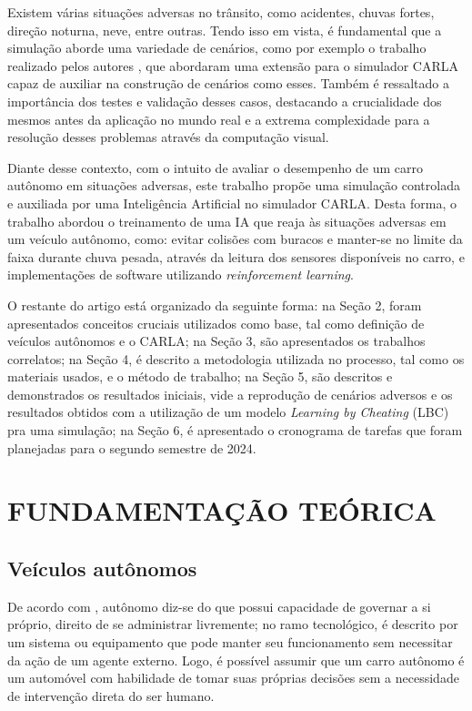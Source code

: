 \documentclass[a4paper,12pt,Times]{article}
\begin{document}
Existem várias situações adversas no trânsito, como acidentes, chuvas fortes, direção noturna, neve, entre outras. Tendo isso em vista, é fundamental que a simulação aborde uma variedade de     cenários, como por exemplo o trabalho realizado pelos autores , que abordaram uma extensão para o simulador CARLA capaz de auxiliar na construção de cenários como esses. Também é ressaltado a importância dos testes e validação desses casos, destacando a crucialidade dos mesmos antes da aplicação no mundo real e a extrema complexidade para a resolução desses problemas através da computação visual.

Diante desse contexto, com o intuito de avaliar o desempenho de um carro autônomo em situações adversas, este trabalho propõe uma simulação controlada e auxiliada por uma Inteligência Artificial no simulador CARLA. Desta forma, o trabalho abordou o treinamento de uma IA que reaja às situações adversas em um veículo autônomo, como: evitar colisões com buracos e manter-se no limite da faixa durante chuva pesada, através da leitura dos sensores disponíveis no carro, e implementações de software utilizando \textit{reinforcement learning}.

O restante do artigo está organizado da seguinte forma: na Seção 2, foram apresentados conceitos cruciais utilizados como base, tal como definição de veículos autônomos e o CARLA; na Seção 3, são apresentados os trabalhos correlatos; na Seção 4, é descrito a metodologia utilizada no processo, tal como os materiais usados, e o método de trabalho; na Seção 5, são descritos e demonstrados os resultados iniciais, vide a reprodução de cenários adversos e os resultados obtidos com a utilização de um modelo \textit{Learning by Cheating} (LBC) pra uma simulação; na Seção 6, é apresentado o cronograma de tarefas que foram planejadas para o segundo semestre de 2024.

\section{FUNDAMENTAÇÃO TEÓRICA}


\subsection{Veículos autônomos}
  
De acordo com , autônomo diz-se do que possui capacidade de governar a si próprio, direito de se administrar livremente; no ramo tecnológico, é descrito por um sistema ou equipamento que pode manter seu funcionamento sem necessitar da ação de um agente externo. Logo, é possível assumir que um carro autônomo é um automóvel com habilidade de tomar suas próprias decisões sem a necessidade de intervenção direta do ser humano. 
\end{document}
